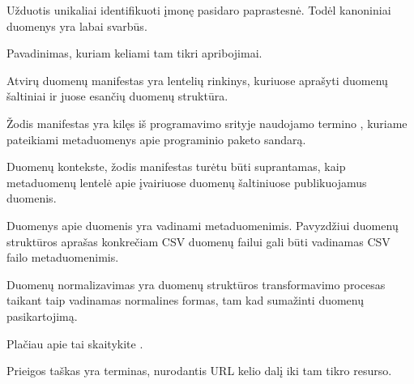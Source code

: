 \documentclass[letterpaper,10pt,lithuanian]{sphinxmanual}
\begin{document}
\begin{description}
\sphinxAtStartPar
Užduotis unikaliai identifikuoti įmonę pasidaro paprastesnė. Todėl
kanoniniai duomenys yra labai svarbūs.

\sphinxAtStartPar
Pavadinimas, kuriam keliami tam tikri apribojimai.

\sphinxAtStartPar
Atvirų duomenų manifestas yra {\hyperref[\detokenize{savokos:term-DSA}]{}} lentelių rinkinys, kuriuose
aprašyti duomenų šaltiniai ir juose esančių duomenų struktūra.

\sphinxAtStartPar
Žodis manifestas yra kilęs iš programavimo srityje naudojamo termino
, kuriame pateikiami metaduomenys apie programinio
paketo sandarą.

\sphinxAtStartPar
Duomenų kontekste, žodis manifestas turėtu būti suprantamas, kaip
metaduomenų lentelė apie įvairiuose duomenų šaltiniuose publikuojamus
duomenis.

\sphinxAtStartPar
Duomenys apie duomenis yra vadinami metaduomenimis. Pavyzdžiui duomenų
struktūros aprašas konkrečiam CSV duomenų failui gali būti vadinamas CSV
failo metaduomenimis.

\sphinxAtStartPar
Duomenų normalizavimas yra duomenų struktūros transformavimo procesas
taikant taip vadinamas normalines formas, tam kad sumažinti duomenų
pasikartojimą.

\sphinxAtStartPar
Plačiau apie tai skaitykite .

\sphinxAtStartPar
Prieigos taškas yra {\hyperref[\detokenize{savokos:term-REST-API}]{}} terminas, nurodantis URL kelio dalį iki tam
tikro resurso.


\end{description}
\end{document}

